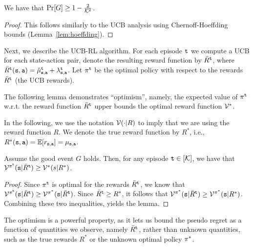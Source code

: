 \begin{lemma}
    We have that  $\Pr[G]\geq 1-\frac{2}{\mathcal K^2}$.
\end{lemma}

\begin{proof}
    This follows similarly to the UCB analysis using Chernoff-Hoeffding bounds (Lemma~\ref{lem:hoeffding}).
\end{proof}

Next, we describe the UCB-RL algorithm. For each episode ${\tt t}$ we compute a UCB for each state-action pair, denote the resulting reward function by $\bar{R}^{\tt t}$, where $\bar{R}^{\tt t}({\tt s},{\tt a})=\hat{\mu}_{{\tt s},{\tt a}}^{\tt t}+\lambda_{{\tt s},{\tt a}}^{\tt t}$.  Let $\pi^{\tt t}$ be the optimal policy with respect to the rewards $\bar{R}^{\tt t}$ (the UCB rewards).

The following lemma demonstrates ``optimism'', namely, the expected value of $\pi^{\tt t}$ w.r.t. the reward function $\bar{R}^{\tt t}$ upper bounds the optimal reward function $\mathcal{V}^*$.

In the following, we use the notation $\mathcal{V}(\cdot|R)$ to imply that we are using the reward function $R$. We denote the true reward function by $R^*$, i.e., $R^*({\tt s},{\tt a})=\mathbb{E}[r_{{\tt s},{\tt a}}]=\mu_{{\tt s},{\tt a}}$.

\begin{lemma}
\label{MAB:lemma:UCB-RL:rewards}
    Assume the good event $G$ holds. Then, for any episode ${\tt t}\in[\mathcal K]$, we have that $\mathcal{V}^{\pi^{\tt t}}({\tt s} | \bar{R}^{\tt t})\geq \mathcal{V}^*(s|R^*)$.
\end{lemma}

\begin{proof}
    Since $\pi^{\tt t}$ is optimal for the rewards $\bar{R}^{\tt t}$, we know that $\mathcal{V}^{\pi^{\tt t}}({\tt s} | \bar{R}^{\tt t})\geq \mathcal{V}^{\pi^*}({\tt s} | \bar{R}^{\tt t})$.
Since $\bar{R}^{\tt t}\geq R^*$, it follows that
$\mathcal{V}^{\pi^*}({\tt s} | \bar{R}^{\tt t})\geq \mathcal{V}^{\pi^*}({\tt s} | R^*)$.
Combining these two inequalities, yields the lemma.
\end{proof}

The optimism is a powerful property, as it lets us bound the pseudo regret as a function of quantities we observe, namely $\bar{R}^{\tt t}$, rather than unknown quantities, such as the true rewards $R^*$ or the unknown optimal policy $\pi^*$.

